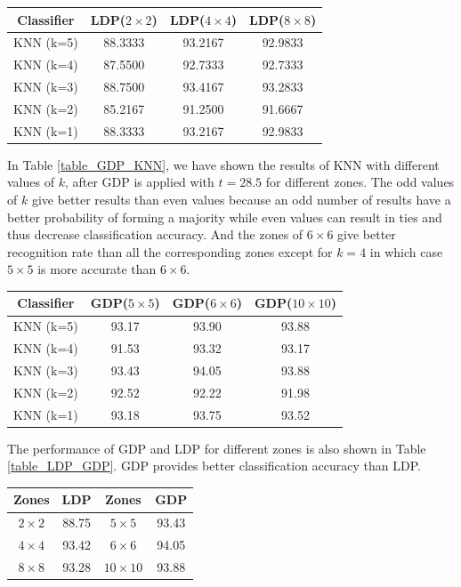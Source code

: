 \documentclass[conference]{IEEEtran}
\begin{document}
\begin{center}
	\label{table_LDP_KNN}
	\begin{tabular}{cccc}
		\hline
		Classifier & LDP($2\times2$) & LDP($4\times4$) & LDP($8\times8$) \\
		\hline
		KNN (k=5) & 88.3333 & 93.2167 & 92.9833\\
		KNN (k=4) & 87.5500 & 92.7333 & 92.7333\\
		KNN (k=3) & 88.7500 & 93.4167 & 93.2833\\
		KNN (k=2) & 85.2167 & 91.2500 & 91.6667\\
		KNN (k=1) & 88.3333 & 93.2167 & 92.9833\\
		\hline
	\end{tabular}
\end{center}

In Table \ref{table_GDP_KNN}, we have shown the results of KNN with different values of $k$, after GDP is applied with $t = 28.5$ for different zones. The odd values of $k$ give better results than even values because an odd number of results have a better probability of forming a majority while even values can result in ties and thus decrease classification accuracy. And the zones of $6\times6$ give better recognition rate than all the corresponding zones except for $k = 4$ in which case $5\times5$ is more accurate than $6\times6$.

\begin{center}
	\label{table_GDP_KNN}
	\begin{tabular}{cccc}
		\hline
		Classifier & GDP($5\times5$) & GDP($6\times6$) & GDP($10\times10$)\\
		\hline
		KNN (k=5) & 93.17 & 93.90 & 93.88\\
		KNN (k=4) & 91.53 & 93.32 & 93.17\\
		KNN (k=3) & 93.43 & 94.05 & 93.88\\
		KNN (k=2) & 92.52 & 92.22 & 91.98\\
		KNN (k=1) & 93.18 & 93.75 & 93.52\\
		\hline
	\end{tabular}
\end{center}

The performance of GDP and LDP for different zones is also shown in Table \ref{table_LDP_GDP}. GDP provides better classification accuracy than LDP.

\begin{center}
	\label{table_LDP_GDP}
	\begin{tabular}{cccc}
		\hline
		Zones & LDP & Zones & GDP \\
		\hline
		$2 \times 2$ & 88.75 & $5 \times 5$ & 93.43 \\
		$4 \times 4$ & 93.42 & $6 \times 6$ & 94.05 \\
		$8 \times 8$ & 93.28 & $10 \times 10$ & 93.88 \\
		\hline
	\end{tabular}
\end{center}
\end{document}
